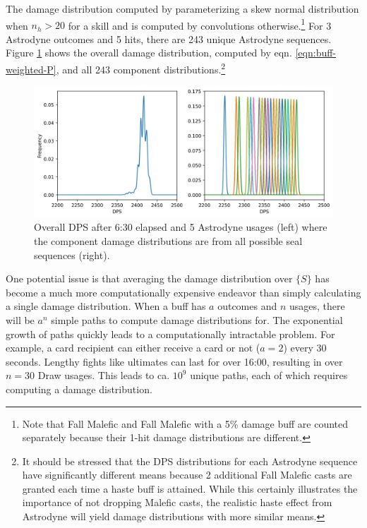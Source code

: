 \documentclass{article}
\begin{document}
    The damage distribution computed by parameterizing a skew normal distribution when $n_h > 20$ for a skill and is computed by convolutions otherwise.\footnote{Note that Fall Malefic and Fall Malefic with a 5\% damage buff are counted separately because their 1-hit damage distributions are different.} For 3 Astrodyne outcomes and 5 hits, there are 243 unique Astrodyne sequences. Figure \ref{fig:random-buff-all-avg} shows the overall damage distribution, computed by eqn. \ref{eqn:buff-weighted-P}, and all 243 component distributions.\footnote{It should be stressed that the DPS distributions for each Astrodyne sequence have significantly different means because 2 additional Fall Malefic casts are granted each time a haste buff is attained. While this certainly illustrates the importance of not dropping Malefic casts, the realistic haste effect from Astrodyne will yield damage distributions with more similar means.}
    \begin{figure}[H]
        \centering
        \includegraphics[width=0.95\linewidth]{img/astrodyne-all-paths.PNG}
        \caption{Overall DPS after 6:30 elapsed and 5 Astrodyne usages (left) where the component damage distributions are from all possible seal sequences (right).}\label{fig:random-buff-all-avg}
    \end{figure}


    One potential issue is that averaging the damage distribution over $\{S\}$ has become a much more computationally expensive endeavor than simply calculating a single damage distribution. When a buff has $a$ outcomes and $n$ usages, there will be $a^n$ simple paths to compute damage distributions for. The exponential growth of paths quickly leads to a computationally intractable problem. For example, a card recipient can either receive a card or not ($a=2$) every 30 seconds. Lengthy fights like ultimates can last for over 16:00, resulting in over $n = 30$ Draw usages. This leads to ca. $10^9$ unique paths, each of which requires computing a damage distribution.     
    
\end{document}
